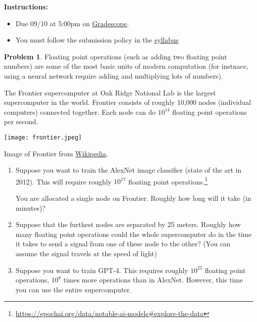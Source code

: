 \documentclass[12pt]{article}
\theoremstyle{definition}
\newtheorem{problem}{Problem}
\begin{document}
\textbf{\Large{}}
    
    \vspace{-1.8em}
    \hrulefill
 
\textbf{Instructions:}
    \begin{itemize}
        \item Due 09/10 at 5:00pm on \href{https://www.gradescope.com/courses/818054}{Gradescope}.
        \item You must follow the submission policy in the \href{https://courses.chen.pw/na_f2024/syllabus.html}{syllabus} 
\end{itemize}

\vfill
\begin{problem}
    Floating point operations (such as adding two floating point numbers) are some of the most basic units of modern computation (for instnace, using a neural network require adding and multiplying lots of numbers).

    The Frontier supercomputer at Oak Ridge National Lab is the largest supercomputer in the world.
    Frontier consists of roughly 10,000 nodes (individual computers) connected together.
    Each node can do $10^{14}$ floating point operations per second.

    \begin{center}
        \texttt{[image: frontier.jpeg]}
        
        Image of Frontier from \href{https://en.wikipedia.org/wiki/Frontier_(supercomputer)}{Wikipedia}.
    \end{center}
    \begin{enumerate}            
        \item 
            Suppose you want to train the AlexNet image classifier (state of the art in 2012).
            This will require roughly $10^{17}$ floating point operations.\footnote{\protect\url{https://epochai.org/data/notable-ai-models\#explore-the-data}}
            
            You are allocated a single node on Frontier.            
            Roughly how long will it take (in minutes)?
        \item 
            Suppose that the furthest nodes are separated by 25 meters.
            Roughly how many floating point operations could the whole supercomputer do in the time it takes to send a signal from one of these node to the other? (You can assume the signal travels at the speed of light)
        \item 
            Suppose you want to train GPT-4.
            This requires roughly $10^{25}$ floating point operations, $10^{8}$ times more operations than in AlexNet.
            However, this time you can use the entire supercomputer.
            

\end{enumerate}
\end{problem}
\end{document}
